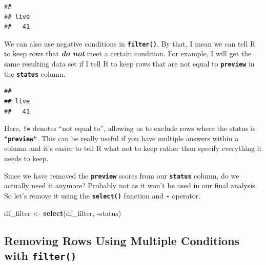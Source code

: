 \documentclass[
]{book}
\newenvironment{Shaded}{\begin{snugshade}}{\end{snugshade}}
\newcommand{\FunctionTok}[1]{\textcolor[rgb]{0.13,0.29,0.53}{\textbf{#1}}}
\newcommand{\NormalTok}[1]{#1}
\newcommand{\OtherTok}[1]{\textcolor[rgb]{0.56,0.35,0.01}{#1}}
\newcommand{\SpecialCharTok}[1]{\textcolor[rgb]{0.81,0.36,0.00}{\textbf{#1}}}
\newcommand{\StringTok}[1]{\textcolor[rgb]{0.31,0.60,0.02}{#1}}
\begin{document}
\begin{verbatim}
## 
## live 
##   41
\end{verbatim}

We can also use negative conditions in \textbf{\texttt{filter()}}. By that, I mean we can tell R to keep rows that \textbf{\emph{do not}} meet a certain condition. For example, I will get the same resulting data set if I tell R to keep rows that are not equal to \textbf{\texttt{preview}} in the \textbf{\texttt{status}} column.

\begin{Shaded}
\end{Shaded}

\begin{verbatim}
## 
## live 
##   41
\end{verbatim}

Here, \textbf{\texttt{!=}} denotes ``not equal to'', allowing us to exclude rows where the status is \textbf{\texttt{"preview"}}. This can be really useful if you have multiple answers within a column and it's easier to tell R what not to keep rather than specify everything it needs to keep.

Since we have removed the \textbf{\texttt{preview}} scores from our \textbf{\texttt{status}} column, do we actually need it anymore? Probably not as it won't be used in our final analysis. So let's remove it using the \textbf{\texttt{select()}} function and \textbf{\texttt{-}} operator.

\begin{Shaded}
\begin{Highlighting}[]
\NormalTok{df\_filter }\OtherTok{\textless{}{-}} \FunctionTok{select}\NormalTok{(df\_filter, }\SpecialCharTok{{-}}\NormalTok{status)}
\end{Highlighting}
\end{Shaded}

\hypertarget{removing-rows-using-multiple-conditions-with-filter}{%
\subsection{\texorpdfstring{Removing Rows Using Multiple Conditions with \texttt{filter()}}{Removing Rows Using Multiple Conditions with filter()}}\label{removing-rows-using-multiple-conditions-with-filter}}
\end{document}
